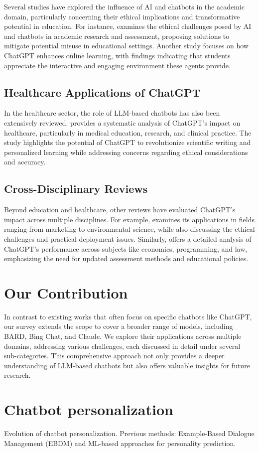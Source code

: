 Several studies have explored the influence of AI and chatbots in the academic domain, particularly concerning their ethical implications and transformative potential in education. For instance, \cite{ai_education_2023} examines the ethical challenges posed by AI and chatbots in academic research and assessment, proposing solutions to mitigate potential misuse in educational settings. Another study \cite{chatgpt_online_learning_2023} focuses on how ChatGPT enhances online learning, with findings indicating that students appreciate the interactive and engaging environment these agents provide.

\subsection{Healthcare Applications of ChatGPT}

In the healthcare sector, the role of LLM-based chatbots has also been extensively reviewed. \cite{chatgpt_healthcare_2023} provides a systematic analysis of ChatGPT's impact on healthcare, particularly in medical education, research, and clinical practice. The study highlights the potential of ChatGPT to revolutionize scientific writing and personalized learning while addressing concerns regarding ethical considerations and accuracy.

\subsection{Cross-Disciplinary Reviews}

Beyond education and healthcare, other reviews have evaluated ChatGPT's impact across multiple disciplines. For example, \cite{chatgpt_multidisciplinary_2023} examines its applications in fields ranging from marketing to environmental science, while also discussing the ethical challenges and practical deployment issues. Similarly, \cite{chatgpt_impact_2023} offers a detailed analysis of ChatGPT's performance across subjects like economics, programming, and law, emphasizing the need for updated assessment methods and educational policies.

\section{Our Contribution}

In contrast to existing works that often focus on specific chatbots like ChatGPT, our survey extends the scope to cover a broader range of models, including BARD, Bing Chat, and Claude. We explore their applications across multiple domains, addressing various challenges, each discussed in detail under several sub-categories. This comprehensive approach not only provides a deeper understanding of LLM-based chatbots but also offers valuable insights for future research.

\section{Chatbot personalization}
Evolution of chatbot personalization. Previous methods: Example-Based Dialogue Management (EBDM) and ML-based approaches for personality prediction.
